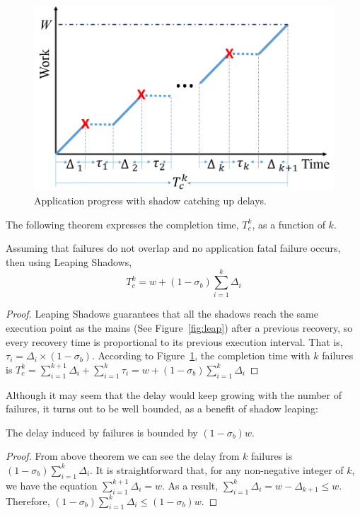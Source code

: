 \begin{figure}[!h]
	\begin{center}
		\includegraphics[width=0.8\columnwidth]{Figures/app_progress}
	\end{center}
	\caption{Application progress with shadow catching up delays.}
	\label{fig:progress}
\end{figure}


The following theorem expresses the completion time, $T_c^k$, as a function of $k$.

\begin{theorem}
Assuming that failures do not overlap and no application fatal failure occurs, then using Leaping Shadows, 
	$$T_c^k = w + (1-\sigma_b)\sum_{i=1}^k\Delta_i$$
\end{theorem}
\begin{proof}
Leaping Shadows guarantees that all the shadows reach the same execution point as the mains (See Figure~\ref{fig:leap}) after a previous recovery, so every recovery time is proportional to its previous execution interval. 
That is, $\tau_i = \Delta_i \times (1 - \sigma_b)$. 
According to Figure~\ref{fig:progress}, the completion time with $k$ failures is 
	$T_c^k = \sum_{i=1}^{k+1}\Delta_i + \sum_{i=1}^k\tau_i = w + (1-\sigma_b)\sum_{i=1}^k\Delta_i$
\end{proof}

Although it may seem that the delay would keep growing with the number of failures, 
it turns out to be well bounded, as a benefit of shadow leaping: 

\begin{corollary}
The delay induced by failures is bounded by $(1-\sigma_b)w$.
\end{corollary}
\begin{proof}
From above theorem we can see the delay from $k$ failures is $(1-\sigma_b)\sum_{i=1}^k\Delta_i$. It is straightforward that, for any non-negative integer of $k$, we have the equation $\sum_{i=1}^{k+1}\Delta_i= w$. As a result, 
$\sum_{i=1}^{k}\Delta_i = w - \Delta_{k+1} \le w$. Therefore, $(1-\sigma_b)\sum_{i=1}^k\Delta_i \le (1-\sigma_b)w$.
\end{proof}

